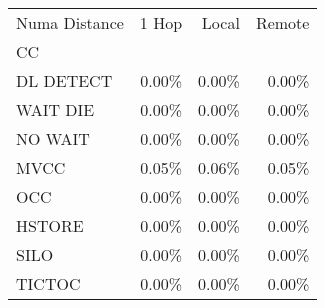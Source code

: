 \begin{tabular}{lrrr}
\toprule
Numa Distance &  1 Hop &  Local &  Remote \\
CC        &        &        &         \\
\midrule
DL DETECT &  0.00\% &  0.00\% &   0.00\% \\
WAIT DIE  &  0.00\% &  0.00\% &   0.00\% \\
NO WAIT   &  0.00\% &  0.00\% &   0.00\% \\
MVCC      &  0.05\% &  0.06\% &   0.05\% \\
OCC       &  0.00\% &  0.00\% &   0.00\% \\
HSTORE    &  0.00\% &  0.00\% &   0.00\% \\
SILO      &  0.00\% &  0.00\% &   0.00\% \\
TICTOC    &  0.00\% &  0.00\% &   0.00\% \\
\bottomrule
\end{tabular}
